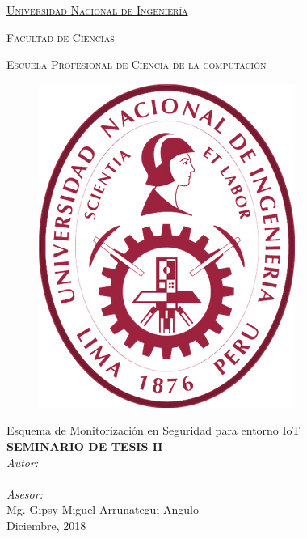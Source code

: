 \documentclass[12pt,spanish,openright]{book}
\author{Briggette Olenka Román Huaytalla}
\def\supervisor{Mg. Gipsy Miguel Arrunategui Angulo}
\def\university{\href{http://www.uni.edu.pe/}{Universidad Nacional de Ingenier\'ia}}
\begin{document}
	\begin{titlepage}
		\centering
		{\scshape \huge \university \par}
		\vspace{0.2cm}
		{\scshape \Large Facultad de Ciencias \par}
		\vspace{0.2cm}
		{\scshape \large Escuela Profesional de Ciencia de la computación \par}

		\begin{figure}[h]
			\centering
			\includegraphics[scale = 0.4]{figure/log_uni}
		\end{figure}
		
		{\LARGE {Esquema de Monitorización en Seguridad para entorno IoT }}\\[1cm]
		{\Large \textbf{SEMINARIO DE TESIS II}}\\[0.5cm]
		\large\emph{Autor: \\}
		{\theauthor}\\
		\large\emph{Asesor:\\ }
		{\supervisor }\\ 
		{\large Diciembre, 2018}\\[4cm] 
		
		
	\end{titlepage}
	
\end{document}
